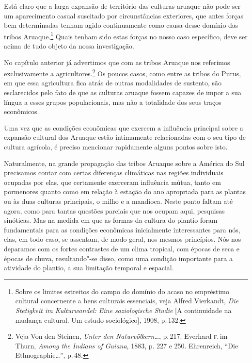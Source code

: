 Está claro que a larga expansão de território das culturas aruaque não
pode ser um aparecimento casual suscitado por circunstâncias exteriores,
que antes forças bem determinadas tenham agido continuamente como causa
desse domínio das tribos Aruaque.\footnote{Sobre os limites estreitos do
  campo do domínio do acaso no empréstimo cultural concernente a bens
  culturais essenciais, veja Alfred Vierkandt, \textit{Die Stetigkeit im
  Kulturwandel: Eine soziologische Studie} {[}A continuidade na mudança
  cultural. Um estudo sociológico{]}, 1908, p.\,132.} Quais tenham sido
estas forças no nosso caso específico, deve ser acima de tudo objeto da
nossa investigação.

No capítulo anterior já advertimos que com as tribos Aruaque nos
referimos exclusivamente a agricultores.\footnote{Veja Von den Steinen,
  \textit{Unter den Naturvölkern\ldots}, p.\,217.
  Everhard \textsc{f}.\,im Thurn, \textit{Among the Indians of Guiana}, 1883, p.
  227 e 250. Ehrenreich, ``Die Ethnographie\ldots'', p.\,48.} Os poucos casos, como entre as tribos do
Purus, em que essa agricultura fica atrás de outras modalidades de
sustento, são esclarecidos pelo fato de que as culturas aruaque fossem
capazes de impor a sua língua a esses grupos populacionais, mas não a
totalidade dos seus traços econômicos.

Uma vez que as condições econômicas que exercem a influência principal
sobre a expansão cultural dos Aruaque estão intimamente relacionadas com
o seu tipo de cultura agrícola, é preciso mencionar rapidamente alguns pontos sobre isto.

Naturalmente, na grande propagação das tribos Aruaque sobre a América do
Sul precisamos contar com certas diferenças climáticas nas regiões
individuais ocupadas por elas, que certamente exerceram influência
mútua, tanto em pormenores quanto como em relação à estação do ano
apropriada para as plantas ou às duas culturas principais, o
milho e a mandioca. Neste ponto faltam até agora, como para tantas
questões parciais que nos ocupam aqui, pesquisas sinóticas. Mas na
medida em que as formas da cultura do plantio foram fundamentais para as
condições econômicas inicialmente interessantes para nós, elas, em todo
caso, se assentam, de modo geral, nos mesmos princípios. Nós nos
deparamos com os fortes contrastes de um clima tropical, com épocas de
seca e épocas de chuva, resultando"-se disso, como uma condição
importante para a atividade do plantio, a sua limitação temporal e
espacial.

